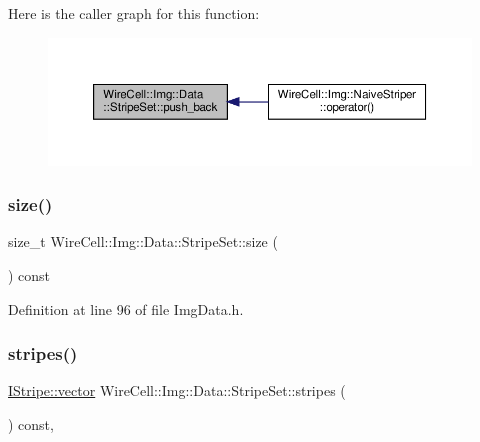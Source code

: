 Here is the caller graph for this function\+:
\nopagebreak
\begin{figure}[H]
\begin{center}
\leavevmode
\includegraphics[width=350pt]{class_wire_cell_1_1_img_1_1_data_1_1_stripe_set_a8ab1bb80a351465a2b7edf6f86380371_icgraph}
\end{center}
\end{figure}
\mbox{\label{class_wire_cell_1_1_img_1_1_data_1_1_stripe_set_adcad4b6e98de85bb67c0543137c453c0}} 
\subsubsection{\texorpdfstring{size()}{size()}}
{\footnotesize\ttfamily size\+\_\+t Wire\+Cell\+::\+Img\+::\+Data\+::\+Stripe\+Set\+::size (\begin{DoxyParamCaption}{ }\end{DoxyParamCaption}) const\hspace{0.3cm}{\ttfamily [inline]}}



Definition at line 96 of file Img\+Data.\+h.

\mbox{\label{class_wire_cell_1_1_img_1_1_data_1_1_stripe_set_aea07fe17999d5c62b2453d62cdc6fd05}} 
\subsubsection{\texorpdfstring{stripes()}{stripes()}}
{\footnotesize\ttfamily \hyperlink{class_wire_cell_1_1_i_data_ae1a9f863380499bb43f39fabb6276660}{I\+Stripe\+::vector} Wire\+Cell\+::\+Img\+::\+Data\+::\+Stripe\+Set\+::stripes (\begin{DoxyParamCaption}{ }\end{DoxyParamCaption}) const\hspace{0.3cm}{\ttfamily [inline]}, {\ttfamily [virtual]}}



